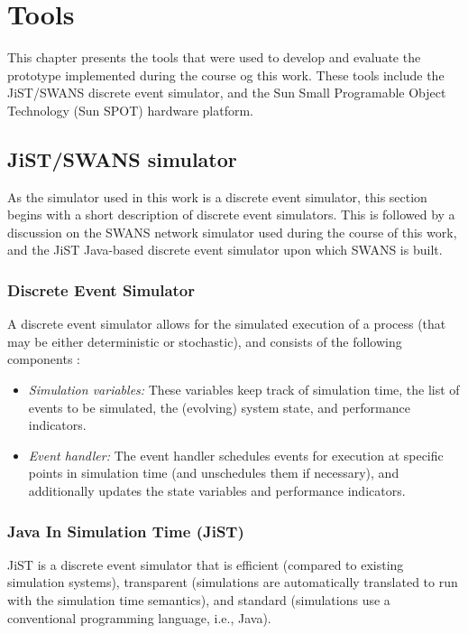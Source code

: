 \chapter{Tools} \label{chap:tools}

This chapter presents the tools that were used to develop and evaluate the
prototype implemented during the course og this work. These tools include the
JiST/SWANS discrete event simulator, and the Sun Small Programable Object
Technology (Sun SPOT) hardware platform. 

\section {JiST/SWANS simulator} \label{sec:jistswans}

As the simulator used in this work is a discrete event simulator, this section
begins with a short description of discrete event simulators. This is followed by
a discussion on the SWANS network simulator used during the course of this work,
and the JiST Java-based discrete event simulator upon which SWANS is built.

\subsection{Discrete Event Simulator}

A discrete event simulator allows for the simulated execution of a process (that
may be either deterministic or stochastic), and consists of the following
components \cite{Shankar_DiscreteEventSim}:

\begin{itemize}
  \item \emph{Simulation variables:} These variables keep track of simulation 
  time, the list of events to be simulated, the (evolving) system state, and 
  performance indicators.
  \item \emph{Event handler:} The event handler schedules events for execution 
  at specific points in simulation time (and unschedules them if necessary), 
  and additionally updates the state variables and performance indicators.
\end{itemize}
 
\subsection{Java In Simulation Time (JiST)} \label{subsec:jist}

JiST \cite{barr_JIST:2005} is a discrete event simulator that is 
efficient (compared to existing simulation systems), 
transparent (simulations are automatically translated to run with the 
simulation time semantics), and standard (simulations use a
conventional programming language, i.e., Java).

